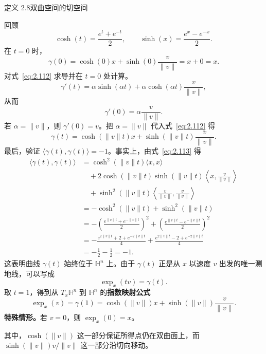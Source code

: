 \begin{statement}{定义 2.8}{双曲空间的切空间}
\begin{figure}[htbp]
  \centering
  
\end{figure}
回顾
\[
  \cosh(t)=\frac{e^t+e^{-t}}2,\qquad
  \sinh(x)=\frac{e^x-e^{-x}}2.
\]
在 $t=0$ 时，
\[
  \gamma(0)=\cosh(0)x+\sinh(0)\frac{v}{\lVert v\rVert}=x+0=x.
\]
对式~\eqref{eq:2.112} 求导并在 $t=0$ 处计算。
\[
  \gamma'(t)=\alpha\sinh(\alpha t)
       +\alpha\cosh(\alpha t)\frac{v}{\lVert v\rVert},
\]
从而
\[
  \gamma'(0)=\alpha\frac{v}{\lVert v\rVert}.
\]
若 $\alpha=\lVert v\rVert$，则 $\gamma'(0)=v$。把 $\alpha=\lVert v\rVert$ 代入式~\eqref{eq:2.112} 得
\begin{equation*}
  \gamma(t)=\cosh(\lVert v\rVert t)x
            +\sinh(\lVert v\rVert t)\frac{v}{\lVert v\rVert}.
  \tag{2.113}\label{eq:2.113}
\end{equation*}
最后，验证 $\langle\gamma(t),\gamma(t)\rangle=-1$。事实上，由式~\eqref{eq:2.113} 得
\[
  \begin{aligned}
    \langle\gamma(t),\gamma(t)\rangle
      &=\cosh^2(\lVert v\rVert t)\langle x,x\rangle\\
      &\quad+2\cosh(\lVert v\rVert t)\sinh(\lVert v\rVert t)
             \left\langle x,\frac{v}{\lVert v\rVert}\right\rangle\\
      &\quad+\sinh^2(\lVert v\rVert t)
             \left\langle\frac{v}{\lVert v\rVert},
                         \frac{v}{\lVert v\rVert}\right\rangle\\
      &=-\cosh^2(\lVert v\rVert t)+\sinh^2(\lVert v\rVert t)\\
      &=-\left(\frac{e^{\lVert v\rVert t}+e^{-\lVert v\rVert t}}2\right)^2
        +\left(\frac{e^{\lVert v\rVert t}-e^{-\lVert v\rVert t}}2\right)^2\\
      &=-\frac{e^{2\lVert v\rVert t}+2+e^{-2\lVert v\rVert t}}4
        +\frac{e^{2\lVert v\rVert t}-2+e^{-2\lVert v\rVert t}}4\\
      &=-\frac12-\frac12=-1.
  \end{aligned}
\]
这表明曲线 $\gamma(t)$ 始终位于 $\mathbb H^n$ 上。由于 $\gamma(t)$ 正是从 $x$ 以速度 $v$ 出发的唯一测地线，可以写成
\begin{equation*}
  \exp_x(tv)=\gamma(t).
  \tag{2.114}\label{eq:2.114}
\end{equation*}
取 $t=1$，得到从 $T_x\mathbb H^n$ 到 $\mathbb H^n$ 的\textbf{指数映射公式}
\begin{equation*}
  \exp_x(v)=\gamma(1)=\cosh(\lVert v\rVert)x+
            \sinh(\lVert v\rVert)\frac{v}{\lVert v\rVert}.
  \tag{2.115}\label{eq:2.115}
\end{equation*}
\textbf{特殊情形。}若 $v=0$，则 $\exp_x(0)=x$。

其中，$\cosh(\lVert v\rVert)$ 这一部分保证所得点仍在双曲面上，而 $\sinh(\lVert v\rVert)v/\lVert v\rVert$ 这一部分沿切向移动。
\end{statement}

